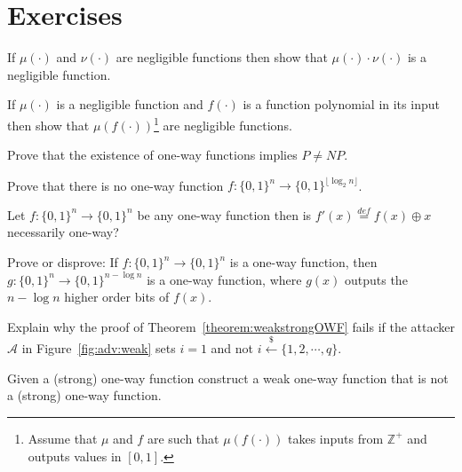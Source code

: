 \documentclass[12pt]{tufte-book}
\begin{document}
\newpage
\section*{Exercises}
\begin{exercise}
\label{ex:product} If $\mu(\cdot)$ and $\nu(\cdot)$ are negligible functions then show that $\mu(\cdot) \cdot \nu(\cdot)$ is a negligible function.
\end{exercise}

\begin{exercise}
\label{ex:product} If $\mu(\cdot)$ is a negligible function and $f(\cdot)$ is a function polynomial in its input then show that $\mu(f(\cdot))$\footnote{Assume that $\mu$ and $f$ are such that $\mu(f(\cdot))$ takes inputs from $\mathbb{Z}^+$ and outputs values in $[0,1]$.} are negligible functions.
\end{exercise}

\begin{exercise}\label{ex:PNP} Prove that the existence of one-way functions implies $P \neq NP$.
\end{exercise}

\begin{exercise}
Prove that there is no one-way function $f:\{0,1\}^n\to \{0,1\}^{\lfloor \log_2 n\rfloor}$.
\end{exercise}


\begin{exercise} Let $f:\{0,1\}^n\to \{0,1\}^{n}$ be any one-way function then is $f'(x) \stackrel{def}{=} f(x)\oplus x$ necessarily one-way?
\end{exercise}

\begin{exercise}
Prove or disprove: If $f: \{0,1\}^n\rightarrow \{0,1\}^n$ is a one-way function, then $g: \{0,1\}^n\rightarrow \{0,1\}^{n-\log n}$ is a one-way function, where $g(x)$ outputs the $n-\log n$ higher order bits of $f(x)$.
\end{exercise}

\begin{exercise}
Explain why the proof of Theorem~\ref{theorem:weakstrongOWF} fails if the attacker $\mathcal{A}$ in Figure~\ref{fig:adv:weak} sets $i = 1$ and not $i \stackrel{\$}{\leftarrow} \{1, 2, \cdots, q\}$.
\end{exercise}

\begin{exercise}
Given a (strong) one-way function construct a weak one-way function that is not a (strong) one-way function.
\end{exercise}
\end{document}
